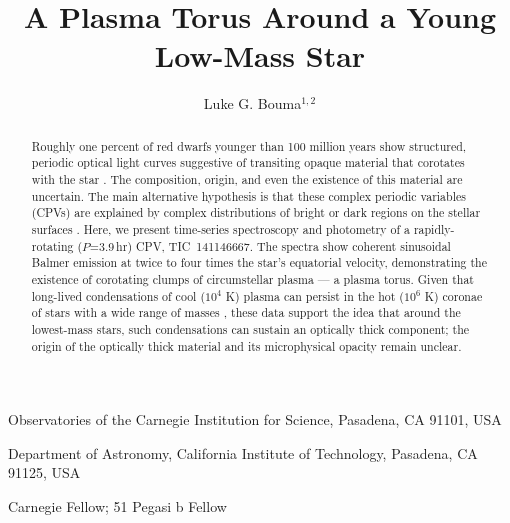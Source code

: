 \documentclass{nature3}
\title{A Plasma Torus Around a Young Low-Mass Star}
\newcommand{\carnegie}{Observatories of the Carnegie Institution for Science, Pasadena, CA 91101, USA}
\newcommand{\caltech}{Department of Astronomy, California Institute of Technology, Pasadena, CA 91125, USA}
\begin{document}
\author{Luke G. Bouma$^{1,2}$}

\maketitle

\scriptsize
\begin{affiliations}
\item \carnegie
\item \caltech
\item Carnegie Fellow; 51 Pegasi b Fellow
\end{affiliations}
\normalsize


\begin{abstract}
\normalfont
Roughly one percent of red dwarfs younger than 100 million years show
structured, periodic optical light curves suggestive of transiting
opaque material that corotates with the star
\cite{Rebull2016,Stauffer2017,Rebull2018,Bouma2024}.  The
composition, origin, and even the existence of this material are
uncertain. The main alternative hypothesis is that these complex
periodic variables (CPVs) are explained by complex distributions of
bright or dark regions on the stellar surfaces \cite{Koen2021}.
Here, we present time-series spectroscopy and photometry of a
rapidly-rotating ($P$=3.9\,hr) CPV, TIC~141146667. The spectra show
coherent sinusoidal Balmer emission at twice to four times the
star's equatorial velocity, demonstrating the existence of
corotating clumps of circumstellar plasma --- a plasma torus.  Given
that long-lived condensations of cool ($10^4$ K) plasma can persist
in the hot ($10^6$ K) coronae of stars with a wide range of masses
\cite{CollierCameron1989,Townsend2005,Dunstone2006,Petit2013,Waugh2022,Daley-Yates2024},
these data support the idea that around the lowest-mass stars, such
condensations can sustain an optically thick component; the origin
of the optically thick material and its microphysical opacity remain
unclear.
\end{abstract}

\maketitle

\end{document}
